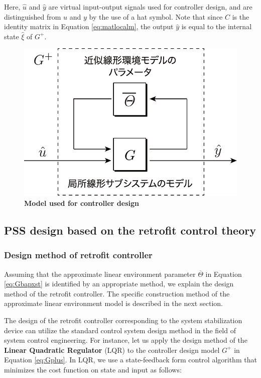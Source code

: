 \documentclass[graybox, envcountchap]{svmult}
\begin{document}
Here, $\hat{u}$ and $\hat{y}$ are virtual input-output signals used for
controller design, and are distinguished from $u$ and $y$ by the use of a hat
symbol. Note that since $C$ is the identity matrix in Equation
\ref{eq:matlocalm}, the output $\hat{y}$ is equal to the internal state
$\hat{\xi}$ of $G^+$.

\begin{figure}[t]
\centering
\includegraphics[width = .50\linewidth]{figs/explocalG2}
\medskip
\caption{\textbf{Model used for controller design}}
\label{fig:explocalG}
\medskip
\end{figure}

\subsection{PSS design based on the retrofit control theory\advanced}\label{sec:designret}

\smallskip
\subsubsection{Design method of retrofit controller}

Assuming that the approximate linear environment parameter
$\overline{\mathit{\Theta}}$ in Equation \ref{eq:Gbapxst} is identified by an
appropriate method, we explain the design method of the retrofit controller. The
specific construction method of the approximate linear environment model is
described in the next section.

The design of the retrofit controller corresponding to the system stabilization
device can utilize the standard control system design method in the field of
system control engineering. For instance, let us apply the design method of the
\textbf{Linear Quadratic Regulator} (LQR) 
\cite[Section 5.3]{fairman1998linear} to the controller design model $G^+$ in
Equation \ref{eq:Gplus}. In LQR, we use a state-feedback form control algorithm
that minimizes the cost function on state and input as follows:
\end{document}
